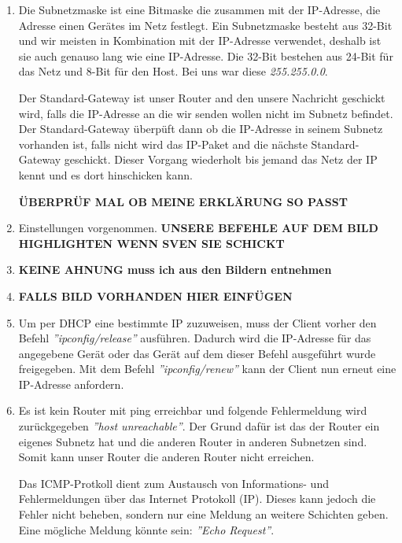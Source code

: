 \documentclass{scrartcl}
\begin{document}
   \renewcommand{\labelenumi}{\alph{enumi})}
   \begin{enumerate}
   \item
   Die Subnetzmaske ist eine Bitmaske die zusammen mit der IP-Adresse, die Adresse einen Gerätes im Netz festlegt. Ein Subnetzmaske besteht aus 32-Bit und wir meisten in Kombination mit der IP-Adresse verwendet, deshalb ist sie auch genauso lang wie eine IP-Adresse. Die 32-Bit bestehen aus 24-Bit für das Netz und 8-Bit für den Host. Bei uns war diese \textit{255.255.0.0}.
   
   Der Standard-Gateway ist unser Router and den unsere Nachricht geschickt wird, falls die IP-Adresse an die wir senden wollen nicht im Subnetz befindet. Der Standard-Gateway überpüft dann ob die IP-Adresse in seinem Subnetz vorhanden ist, falls nicht wird das IP-Paket and die nächste Standard-Gateway geschickt. Dieser Vorgang wiederholt bis jemand das Netz der IP kennt und es dort hinschicken kann.

   \textbf{ÜBERPRÜF MAL OB MEINE ERKLÄRUNG SO PASST}   

   \item
   Einstellungen vorgenommen. \textbf{UNSERE BEFEHLE AUF DEM BILD HIGHLIGHTEN WENN SVEN SIE SCHICKT}
   
   \item
   \textbf{KEINE AHNUNG muss ich aus den Bildern entnehmen}
   
   \item
   \textbf{FALLS BILD VORHANDEN HIER EINFÜGEN}
   
   \item
   Um per DHCP eine bestimmte IP zuzuweisen, muss der Client vorher den Befehl \textit{''ipconfig/release''} ausführen. Dadurch wird die IP-Adresse für das angegebene Gerät oder das Gerät auf dem dieser Befehl ausgeführt wurde freigegeben. Mit dem Befehl \textit{''ipconfig/renew''} kann der Client nun erneut eine IP-Adresse anfordern.
   
   \item
   Es ist kein Router mit ping erreichbar und folgende Fehlermeldung wird zurückgegeben \textit{''host unreachable''}. Der Grund dafür ist das der Router ein eigenes Subnetz hat und die anderen Router in anderen Subnetzen sind. Somit kann unser Router die anderen Router nicht erreichen.
   
   Das ICMP-Protkoll dient zum Austausch von Informations- und Fehlermeldungen über das Internet Protokoll (IP). Dieses kann jedoch die Fehler nicht beheben, sondern nur eine Meldung an weitere Schichten geben. Eine mögliche Meldung könnte sein: \textit{''Echo Request''}.
   \end{enumerate}
   
\end{document}
